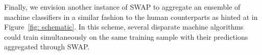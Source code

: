 \documentclass[twocolumn]{aastex6}
\begin{document}
Finally, we envision another instance of SWAP to aggregate an ensemble of machine classifiers in a similar fashion to the human counterparts as hinted at in Figure~\ref{fig: schematic}.
In this scheme, several disparate machine algorithms could train simultaneously 
on the same training sample with their predictions aggregated through SWAP. 



\end{document}
